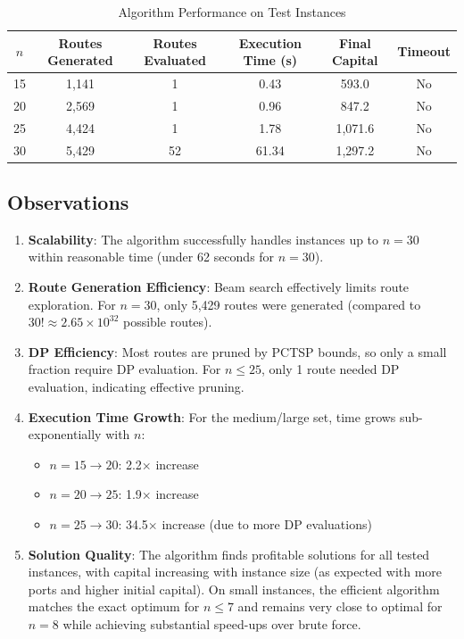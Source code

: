 \documentclass[12pt]{article}
\begin{document}
\begin{table}[h]
\centering
\caption{Algorithm Performance on Test Instances}
\label{tab:performance}
\begin{tabular}{c|ccccc}
\toprule
$n$ & Routes Generated & Routes Evaluated & Execution Time (s) & Final Capital & Timeout \\
\midrule
15 & 1,141 & 1 & 0.43 & 593.0 & No \\
20 & 2,569 & 1 & 0.96 & 847.2 & No \\
25 & 4,424 & 1 & 1.78 & 1,071.6 & No \\
30 & 5,429 & 52 & 61.34 & 1,297.2 & No \\
\bottomrule
\end{tabular}
\end{table}

\subsection{Observations}

\begin{enumerate}
    \item \textbf{Scalability}: The algorithm successfully handles instances up to $n=30$ within reasonable time (under 62 seconds for $n=30$).
    
    \item \textbf{Route Generation Efficiency}: Beam search effectively limits route exploration. For $n=30$, only 5,429 routes were generated (compared to $30! \approx 2.65 \times 10^{32}$ possible routes).
    
    \item \textbf{DP Efficiency}: Most routes are pruned by PCTSP bounds, so only a small fraction require DP evaluation. For $n \leq 25$, only 1 route needed DP evaluation, indicating effective pruning.
    
    \item \textbf{Execution Time Growth}: For the medium/large set, time grows sub-exponentially with $n$:
    \begin{itemize}
        \item $n=15 \rightarrow 20$: 2.2$\times$ increase
        \item $n=20 \rightarrow 25$: 1.9$\times$ increase  
        \item $n=25 \rightarrow 30$: 34.5$\times$ increase (due to more DP evaluations)
    \end{itemize}
    
    \item \textbf{Solution Quality}: The algorithm finds profitable solutions for all tested instances, with capital increasing with instance size (as expected with more ports and higher initial capital). On small instances, the efficient algorithm matches the exact optimum for $n \leq 7$ and remains very close to optimal for $n=8$ while achieving substantial speed-ups over brute force.
\end{enumerate}
\end{document}
